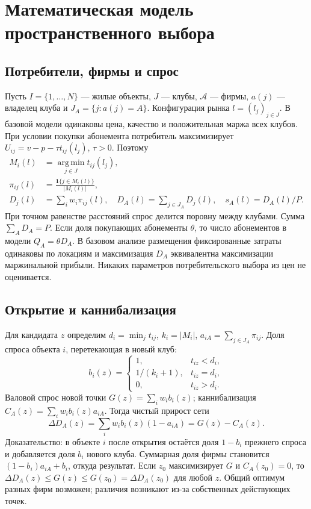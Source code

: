 \documentclass[12pt,a4paper]{article}
\newcommand{\one}{\mathbf{1}}
\newcommand{\argmin}{\operatorname*{arg\,min}}
\begin{document}
\section{Математическая модель пространственного выбора}
\subsection{Потребители, фирмы и спрос}
Пусть $I=\{1,\ldots,N\}$ --- жилые объекты, $J$ --- клубы, $\mathcal A$ --- фирмы, $a(j)$ --- владелец клуба и $J_A=\{j:a(j)=A\}$. Конфигурация рынка $l=(l_j)_{j\in J}$. В базовой модели одинаковы цена, качество и положительная маржа всех клубов. При условии покупки абонемента потребитель максимизирует $U_{ij}=v-p-\tau t_{ij}(l_j)$, $\tau>0$. Поэтому
\begin{align}
 M_i(l)&=\argmin_{j\in J}t_{ij}(l_j),\\
 \pi_{ij}(l)&=\frac{\one\{j\in M_i(l)\}}{|M_i(l)|},\\
 D_j(l)&=\sum_iw_i\pi_{ij}(l),\quad D_A(l)=\sum_{j\in J_A}D_j(l),\quad s_A(l)=D_A(l)/P.
\end{align}
При точном равенстве расстояний спрос делится поровну между клубами. Сумма $\sum_A D_A=P$. Если доля покупающих абонементы $\theta$, то число абонементов в модели $Q_A=\theta D_A$. В базовом анализе размещения фиксированные затраты одинаковы по локациям и максимизация $D_A$ эквивалентна максимизации маржинальной прибыли. Никаких параметров потребительского выбора из цен не оценивается.
\subsection{Открытие и каннибализация}
Для кандидата $z$ определим $d_i=\min_jt_{ij}$, $k_i=|M_i|$, $a_{iA}=\sum_{j\in J_A}\pi_{ij}$. Доля спроса объекта $i$, перетекающая в новый клуб:
\begin{equation}
 b_i(z)=\begin{cases}1,&t_{iz}<d_i,\\1/(k_i+1),&t_{iz}=d_i,\\0,&t_{iz}>d_i.\end{cases}
\end{equation}
Валовой спрос новой точки $G(z)=\sum_iw_ib_i(z)$; каннибализация $C_A(z)=\sum_iw_ib_i(z)a_{iA}$. Тогда чистый прирост сети
\begin{equation}
 \Delta D_A(z)=\sum_iw_ib_i(z)(1-a_{iA})=G(z)-C_A(z).
\end{equation}
Доказательство: в объекте $i$ после открытия остаётся доля $1-b_i$ прежнего спроса и добавляется доля $b_i$ нового клуба. Суммарная доля фирмы становится $(1-b_i)a_{iA}+b_i$, откуда результат. Если $z_0$ максимизирует $G$ и $C_A(z_0)=0$, то $\Delta D_A(z)\le G(z)\le G(z_0)=\Delta D_A(z_0)$ для любой $z$. Общий оптимум разных фирм возможен; различия возникают из-за собственных действующих точек.
\end{document}
